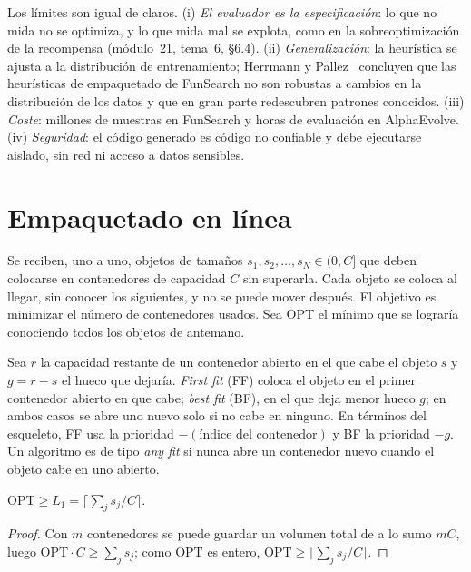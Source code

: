 Los límites son igual de claros. (i) \emph{El evaluador es la especificación}: lo que no mida no se optimiza, y lo que mida mal se explota, como en la sobreoptimización de la recompensa (módulo~21, tema~6, §6.4). (ii) \emph{Generalización}: la heurística se ajusta a la distribución de entrenamiento; Herrmann y Pallez~\cite{hp} concluyen que las heurísticas de empaquetado de FunSearch no son robustas a cambios en la distribución de los datos y que en gran parte redescubren patrones conocidos. (iii) \emph{Coste}: millones de muestras en FunSearch y horas de evaluación en AlphaEvolve. (iv) \emph{Seguridad}: el código generado es código no confiable y debe ejecutarse aislado, sin red ni acceso a datos sensibles.

\section{Empaquetado en línea}

\begin{definicion}\label{def:bp}
Se reciben, uno a uno, objetos de tamaños $s_1,s_2,\dots,s_N\in(0,C]$ que deben colocarse en contenedores de capacidad $C$ sin superarla. Cada objeto se coloca al llegar, sin conocer los siguientes, y no se puede mover después. El objetivo es minimizar el número de contenedores usados. Sea $\mathrm{OPT}$ el mínimo que se lograría conociendo todos los objetos de antemano.
\end{definicion}

\begin{definicion}\label{def:ff-bf}
Sea $r$ la capacidad restante de un contenedor abierto en el que cabe el objeto $s$ y $g=r-s$ el hueco que dejaría. \emph{First fit} (FF) coloca el objeto en el primer contenedor abierto en que cabe; \emph{best fit} (BF), en el que deja menor hueco $g$; en ambos casos se abre uno nuevo solo si no cabe en ninguno. En términos del esqueleto, FF usa la prioridad $-(\text{índice del contenedor})$ y BF la prioridad $-g$. Un algoritmo es de tipo \emph{any fit} si nunca abre un contenedor nuevo cuando el objeto cabe en uno abierto.
\end{definicion}

\begin{lema}[Cota $L_1$]\label{lem:l1}
$\mathrm{OPT}\ge L_1=\bigl\lceil\sum_{j}s_j/C\bigr\rceil$.
\end{lema}

\begin{proof}
Con $m$ contenedores se puede guardar un volumen total de a lo sumo $mC$, luego $\mathrm{OPT}\cdot C\ge\sum_j s_j$; como $\mathrm{OPT}$ es entero, $\mathrm{OPT}\ge\lceil\sum_j s_j/C\rceil$.
\end{proof}

